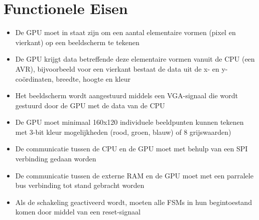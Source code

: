 \documentclass{scrreprt} %
\begin{document}
\section {Functionele Eisen}
\begin {itemize}
\item De GPU moet in staat zijn om een aantal elementaire vormen (pixel en vierkant) op een beeldscherm te tekenen
\item De GPU krijgt data betreffende deze elementaire vormen vanuit de CPU (een AVR), bijvoorbeeld voor een vierkant bestaat de data uit de x- en y-coördinaten, breedte, hoogte en kleur
\item Het beeldscherm wordt aangestuurd middels een VGA-signaal die wordt gestuurd door de GPU met de data van de CPU
\item De GPU moet minimaal 160x120 individuele beeldpunten kunnen tekenen met 3-bit kleur mogelijkheden (rood, groen, blauw) of 8 grijswaarden)
\item De communicatie tussen de CPU en de GPU moet met behulp van een SPI verbinding gedaan worden
\item De communicatie tussen de externe RAM en de GPU moet met een parralele bus verbinding tot stand gebracht worden
\item Als de schakeling geactiveerd wordt, moeten alle FSMs in hun begintoestand komen door middel van een reset-signaal
\end{itemize}
\end{document}
